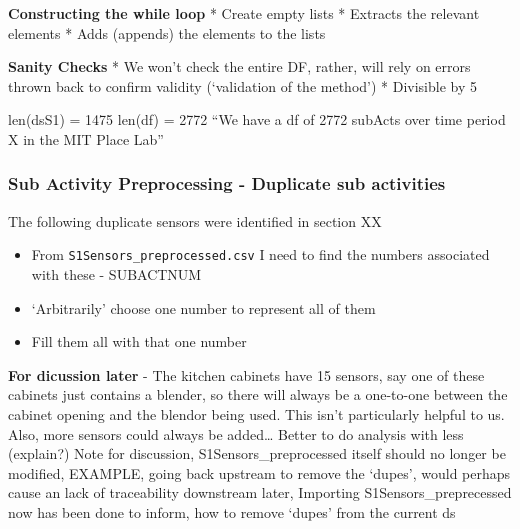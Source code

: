\documentclass[11pt,]{article}
\providecommand{\tightlist}{%
  \setlength{\itemsep}{0pt}\setlength{\parskip}{0pt}}
\begin{document}
\textbf{Constructing the while loop} * Create empty lists * Extracts the
relevant elements * Adds (appends) the elements to the lists

\textbf{Sanity Checks} * We won't check the entire DF, rather, will rely
on errors thrown back to confirm validity (`validation of the method') *
Divisible by 5

len(dsS1) = 1475 len(df) = 2772 ``We have a df of 2772 subActs over time
period X in the MIT Place Lab''

\hypertarget{sub-activity-preprocessing---duplicate-sub-activities}{%
\subsubsection{Sub Activity Preprocessing - Duplicate sub
activities}\label{sub-activity-preprocessing---duplicate-sub-activities}}

The following duplicate sensors were identified in section XX

\begin{itemize}
\tightlist
\item
  From \texttt{S1Sensors\_preprocessed.csv} I need to find the numbers
  associated with these - SUBACTNUM
\item
  `Arbitrarily' choose one number to represent all of them
\item
  Fill them all with that one number
\end{itemize}

\textbf{For dicussion later} - The kitchen cabinets have 15 sensors, say
one of these cabinets just contains a blender, so there will always be a
one-to-one between the cabinet opening and the blendor being used. This
isn't particularly helpful to us. Also, more sensors could always be
added\ldots{} Better to do analysis with less (explain?) Note for
discussion, S1Sensors\_preprocessed itself should no longer be modified,
EXAMPLE, going back upstream to remove the `dupes', would perhaps cause
an lack of traceability downstream later, Importing
S1Sensors\_preprecessed now has been done to inform, how to remove
`dupes' from the current ds
\end{document}
